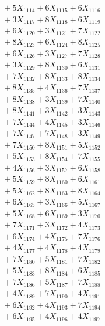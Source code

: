 \documentclass[a4paper,10pt]{article}
\begin{document}
{\begin{align}
&\;  + 5 X_{1114} + 6 X_{1115} + 6 X_{1116} \\[0.3ex]
&\;  + 3 X_{1117} + 8 X_{1118} + 6 X_{1119} \\[0.5ex]\allowbreak
&\;  + 6 X_{1120} + 3 X_{1121} + 7 X_{1122} \\[0.3ex]
&\;  + 8 X_{1123} + 6 X_{1124} + 8 X_{1125} \\[0.3ex]
&\;  + 6 X_{1126} + 3 X_{1127} + 7 X_{1128} \\[0.3ex]
&\;  + 3 X_{1129} + 8 X_{1130} + 6 X_{1131} \\[0.3ex]
&\;  + 7 X_{1132} + 8 X_{1133} + 8 X_{1134} \\[0.3ex]
&\;  + 8 X_{1135} + 4 X_{1136} + 7 X_{1137} \\[0.3ex]
&\;  + 8 X_{1138} + 3 X_{1139} + 7 X_{1140} \\[0.3ex]
&\;  + 8 X_{1141} + 3 X_{1142} + 3 X_{1143} \\[0.3ex]
&\;  + 7 X_{1144} + 4 X_{1145} + 3 X_{1146} \\[0.3ex]
&\;  + 7 X_{1147} + 7 X_{1148} + 3 X_{1149} \\[0.5ex]\allowbreak
&\;  + 7 X_{1150} + 8 X_{1151} + 5 X_{1152} \\[0.3ex]
&\;  + 5 X_{1153} + 8 X_{1154} + 7 X_{1155} \\[0.3ex]
&\;  + 4 X_{1156} + 3 X_{1157} + 6 X_{1158} \\[0.3ex]
&\;  + 5 X_{1159} + 8 X_{1160} + 6 X_{1161} \\[0.3ex]
&\;  + 5 X_{1162} + 8 X_{1163} + 8 X_{1164} \\[0.3ex]
&\;  + 6 X_{1165} + 3 X_{1166} + 5 X_{1167} \\[0.3ex]
&\;  + 5 X_{1168} + 6 X_{1169} + 3 X_{1170} \\[0.3ex]
&\;  + 7 X_{1171} + 3 X_{1172} + 4 X_{1173} \\[0.3ex]
&\;  + 6 X_{1174} + 4 X_{1175} + 7 X_{1176} \\[0.3ex]
&\;  + 4 X_{1177} + 4 X_{1178} + 4 X_{1179} \\[0.5ex]\allowbreak
&\;  + 7 X_{1180} + 5 X_{1181} + 7 X_{1182} \\[0.3ex]
&\;  + 5 X_{1183} + 8 X_{1184} + 6 X_{1185} \\[0.3ex]
&\;  + 7 X_{1186} + 5 X_{1187} + 7 X_{1188} \\[0.3ex]
&\;  + 4 X_{1189} + 7 X_{1190} + 4 X_{1191} \\[0.3ex]
&\;  + 6 X_{1192} + 4 X_{1193} + 7 X_{1194} \\[0.3ex]
&\;  + 6 X_{1195} + 4 X_{1196} + 4 X_{1197} \\[0.3ex]

\end{align}}
\end{document}
